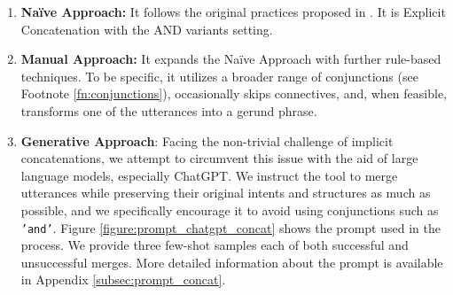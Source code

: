 \begin{enumerate}
    \item \textbf{Na\"ive Approach:}
    It follows the original practices proposed in .
    It is Explicit Concatenation with the AND variants setting. 
    \item \textbf{Manual Approach:} It expands the Na\"ive Approach with further rule-based techniques. 
    To be specific, it utilizes a broader range of conjunctions (see Footnote \ref{fn:conjunctions}), occasionally skips connectives, and, when feasible, transforms one of the utterances into a gerund phrase.
    \item \textbf{Generative Approach}: Facing the non-trivial challenge of implicit concatenations, we attempt to circumvent this issue with the aid of large language models, especially ChatGPT.
    We instruct the tool to merge utterances while preserving their original intents and structures as much as possible, and we specifically encourage it to avoid using conjunctions such as \texttt{'and'}.
    Figure \ref{figure:prompt_chatgpt_concat} shows the prompt used in the process. 
    We provide three few-shot samples each of both successful and unsuccessful merges.
    More detailed information about the prompt is available in Appendix \ref{subsec:prompt_concat}.
    \label{table:metric_samples}
\end{enumerate}

